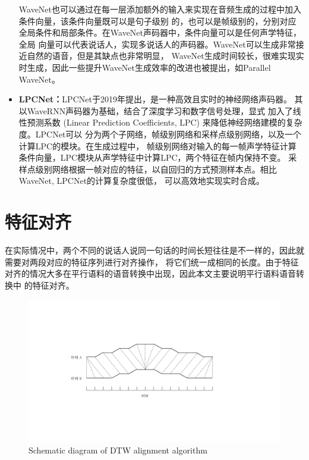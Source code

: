 \begin{itemize}
    WaveNet也可以通过在每一层添加额外的输入来实现在音频生成的过程中加入条件向量，该条件向量既可以是句子级别
    的，也可以是帧级别的，分别对应全局条件和局部条件。在WaveNet声码器中，条件向量可以是任何声学特征，全局
    向量可以代表说话人，实现多说话人的声码器。WaveNet可以生成非常接近自然的语音，但是其缺点也非常明显，
    WaveNet生成时间较长，很难实现实时生成，因此一些提升WaveNet生成效率的改进也被提出，如Parallel WaveNet\cite{oord2017parallel}。
    
    \item \textbf{LPCNet：}LPCNet于2019年提出，是一种高效且实时的神经网络声码器。
    其以WaveRNN声码器\cite{kalchbrenner2018efficient}为基础，结合了深度学习和数字信号处理，显式
    加入了线性预测系数 (Linear Prediction Coefficients, LPC) 来降低神经网络建模的复杂度。LPCNet可以
    分为两个子网络，帧级别网络和采样点级别网络，以及一个计算LPC的模块。在生成过程中，
    帧级别网络对输入的每一帧声学特征计算条件向量，LPC模块从声学特征中计算LPC，两个特征在帧内保持不变。
    采样点级别网络根据一帧对应的特征，以自回归的方式预测样本点。相比WaveNet, LPCNet的计算复杂度很低，
    可以高效地实现实时合成。
\end{itemize}

\section{特征对齐}
在实际情况中，两个不同的说话人说同一句话的时间长短往往是不一样的，因此就需要对两段对应的特征序列进行对齐操作，
将它们统一成相同的长度。由于特征对齐的情况大多在平行语料的语音转换中出现，因此本文主要说明平行语料语音转换中
的特征对齐。

\begin{figure}[!htp]
    \centering
    \includegraphics[width=13cm,trim=100 120 150 110,clip]{figure/2_dtw.pdf}
    {Schematic diagram of DTW alignment algorithm}
    \label{fig:dtw}
\end{figure}

